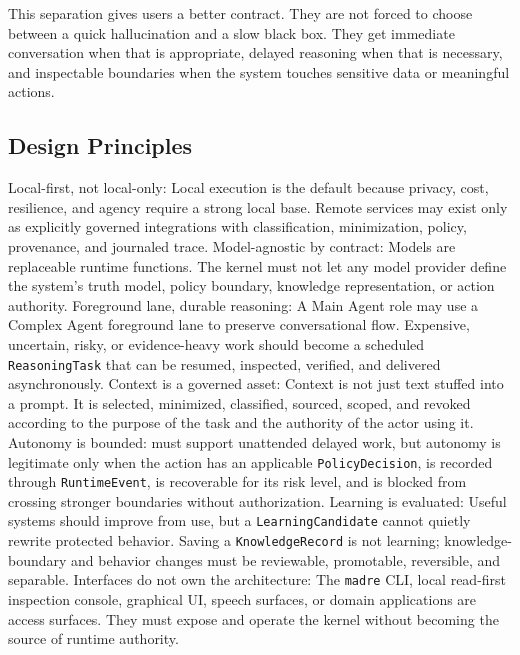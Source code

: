 This separation gives users a better contract. They are not forced to choose between a quick hallucination and a slow black box. They get immediate conversation when that is appropriate, delayed reasoning when that is necessary, and inspectable boundaries when the system touches sensitive data or meaningful actions.

\subsection{Design Principles}

\begin{itemize}
	\itembf Local-first, not local-only: Local execution is the default because privacy, cost, resilience, and agency require a strong local base. Remote services may exist only as explicitly governed integrations with classification, minimization, policy, provenance, and journaled trace.
	\itembf Model-agnostic by contract: Models are replaceable runtime functions. The kernel must not let any model provider define the system's truth model, policy boundary, knowledge representation, or action authority.
	\itembf Foreground lane, durable reasoning: A Main Agent role may use a Complex Agent foreground lane to preserve conversational flow. Expensive, uncertain, risky, or evidence-heavy work should become a scheduled \texttt{ReasoningTask} that can be resumed, inspected, verified, and delivered asynchronously.
	\itembf Context is a governed asset: Context is not just text stuffed into a prompt. It is selected, minimized, classified, sourced, scoped, and revoked according to the purpose of the task and the authority of the actor using it.
	\itembf Autonomy is bounded: \Madre must support unattended delayed work, but autonomy is legitimate only when the action has an applicable \texttt{PolicyDecision}, is recorded through \texttt{RuntimeEvent}, is recoverable for its risk level, and is blocked from crossing stronger boundaries without authorization.
	\itembf Learning is evaluated: Useful systems should improve from use, but a \texttt{LearningCandidate} cannot quietly rewrite protected behavior. Saving a \texttt{KnowledgeRecord} is not learning; knowledge-boundary and behavior changes must be reviewable, promotable, reversible, and separable.
	\itembf Interfaces do not own the architecture:	The \texttt{madre} CLI, local read-first inspection console, graphical UI, speech surfaces, or domain applications are access surfaces. They must expose and operate the kernel without becoming the source of runtime authority.
\end{itemize}

